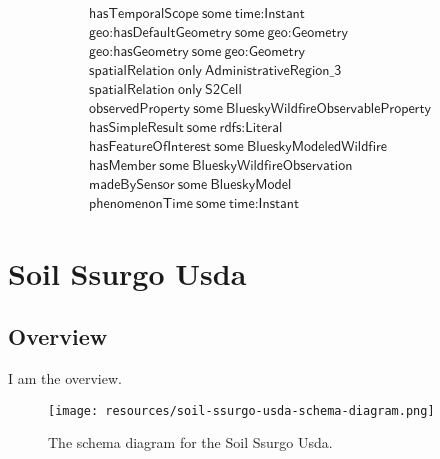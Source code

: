\begin{align}
  \textsf{hasTemporalScope}~\textsf{some}~\textsf{time:Instant}\\
  \textsf{geo:hasDefaultGeometry}~\textsf{some}~\textsf{geo:Geometry}\\
  \textsf{geo:hasGeometry}~\textsf{some}~\textsf{geo:Geometry}\\
  \textsf{spatialRelation}~\textsf{only}~\textsf{AdministrativeRegion\_3}\\
  \textsf{spatialRelation}~\textsf{only}~\textsf{S2Cell}\\
  \textsf{observedProperty}~\textsf{some}~\textsf{BlueskyWildfireObservableProperty}\\
  \textsf{hasSimpleResult}~\textsf{some}~\textsf{rdfs:Literal}\\
  \textsf{hasFeatureOfInterest}~\textsf{some}~\textsf{BlueskyModeledWildfire}\\
  \textsf{hasMember}~\textsf{some}~\textsf{BlueskyWildfireObservation}\\
  \textsf{madeBySensor}~\textsf{some}~\textsf{BlueskyModel}\\
  \textsf{phenomenonTime}~\textsf{some}~\textsf{time:Instant}\end{align}



\section{Soil Ssurgo Usda}
\label{sec:soil-ssurgo-usda}
\subsection{Overview}
\label{ssec:overview}

I am the overview.

\begin{figure}[h!]
  \begin{center}
    \texttt{[image: resources/soil-ssurgo-usda-schema-diagram.png]}
  \end{center}
  \caption{The schema diagram for the Soil Ssurgo Usda.}
  \label{fig:ov-diagram}
\end{figure}


